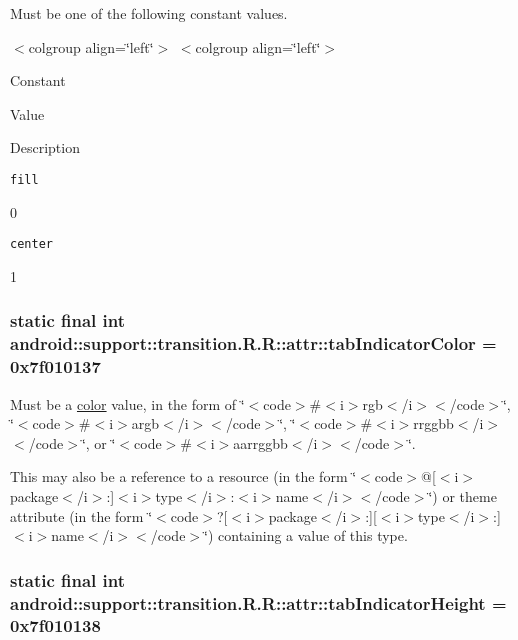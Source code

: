 Must be one of the following constant values. \begin{TabularC}{0}
\hline
\end{TabularC}
$<$colgroup align=\char`\"{}left\char`\"{}$>$ $<$colgroup align=\char`\"{}left\char`\"{}$>$ 

Constant

Value

Description 

{\tt fill}

0

{\tt center}

1\hypertarget{classandroid_1_1support_1_1transition_1_1_r_1_1attr_30241fbb2de00364859c4e0784b6d5c1}{
\subsubsection[{tabIndicatorColor}]{\setlength{\rightskip}{0pt plus 5cm}static final int android::support::transition.R.R::attr::tabIndicatorColor = 0x7f010137}}
\label{classandroid_1_1support_1_1transition_1_1_r_1_1attr_30241fbb2de00364859c4e0784b6d5c1}


Must be a \hyperlink{classandroid_1_1support_1_1transition_1_1_r_1_1color}{color} value, in the form of \char`\"{}$<$code$>$\#$<$i$>$rgb$<$/i$>$$<$/code$>$\char`\"{}, \char`\"{}$<$code$>$\#$<$i$>$argb$<$/i$>$$<$/code$>$\char`\"{}, \char`\"{}$<$code$>$\#$<$i$>$rrggbb$<$/i$>$$<$/code$>$\char`\"{}, or \char`\"{}$<$code$>$\#$<$i$>$aarrggbb$<$/i$>$$<$/code$>$\char`\"{}. 

This may also be a reference to a resource (in the form \char`\"{}$<$code$>$@\mbox{[}$<$i$>$package$<$/i$>$:\mbox{]}$<$i$>$type$<$/i$>$:$<$i$>$name$<$/i$>$$<$/code$>$\char`\"{}) or theme attribute (in the form \char`\"{}$<$code$>$?\mbox{[}$<$i$>$package$<$/i$>$:\mbox{]}\mbox{[}$<$i$>$type$<$/i$>$:\mbox{]}$<$i$>$name$<$/i$>$$<$/code$>$\char`\"{}) containing a value of this type. \hypertarget{classandroid_1_1support_1_1transition_1_1_r_1_1attr_07faa0ebaca45b436d6fe428f797dead}{
\subsubsection[{tabIndicatorHeight}]{\setlength{\rightskip}{0pt plus 5cm}static final int android::support::transition.R.R::attr::tabIndicatorHeight = 0x7f010138}}
\label{classandroid_1_1support_1_1transition_1_1_r_1_1attr_07faa0ebaca45b436d6fe428f797dead}


